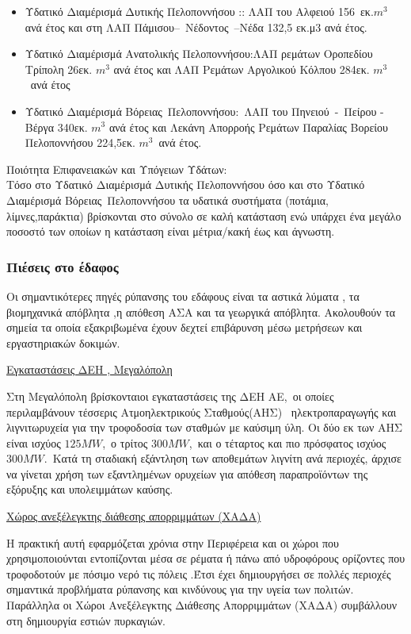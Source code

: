 \documentclass[12pt]{article}
\begin{document}
	\begin{itemize}
		\item Υδατικό Διαμέρισμά Δυτικής Πελοποννήσου :: ΛΑΠ του Αλφειού 156 εκ.$m^3$ ανά έτος και στη ΛΑΠ Πάμισου– Νέδοντος –Νέδα 132,5 εκ.μ3 ανά έτος.
		\item Υδατικό Διαμέρισμά Ανατολικής Πελοποννήσου:ΛΑΠ ρεμάτων Οροπεδίου Τρίπολη 26εκ. $m^3$ ανά έτος και ΛΑΠ Ρεμάτων Αργολικού Κόλπου 284εκ. $m^3$ ανά έτος
 		\item Υδατικό Διαμέρισμά Βόρειας Πελοποννήσου: ΛΑΠ του Πηνειού - Πείρου - Βέργα 340εκ. $m^3$ ανά έτος και  Λεκάνη Απορροής Ρεμάτων Παραλίας Βορείου Πελοποννήσου 224,5εκ. $m^3$ ανά έτος.
	\end{itemize}
	
	Ποιότητα Επιφανειακών και Υπόγειων Υδάτων: \\
	Τόσο στο Υδατικό Διαμέρισμά Δυτικής Πελοποννήσου όσο και στο Υδατικό Διαμέρισμά Βόρειας Πελοποννήσου τα υδατικά συστήματα (ποτάμια, λίμνες,παράκτια) βρίσκονται στο σύνολο σε καλή κατάσταση ενώ υπάρχει ένα μεγάλο ποσοστό των οποίων η κατάσταση είναι μέτρια/κακή έως και άγνωστη.
	
	\subsubsection{Πιέσεις στο έδαφος}
	
	Οι σημαντικότερες πηγές ρύπανσης του εδάφους είναι τα αστικά λύματα , τα βιομηχανικά απόβλητα ,η απόθεση ΑΣΑ και τα γεωργικά απόβλητα. Ακολουθούν τα σημεία τα οποία εξακριβωμένα έχουν δεχτεί επιβάρυνση μέσω μετρήσεων και εργαστηριακών δοκιμών.
	
	\underline{Εγκαταστάσεις ΔΕΗ , Μεγαλόπολη}
	
	Στη Μεγαλόπολη βρίσκονταιοι εγκαταστάσεις της ΔΕΗ ΑΕ, οι οποίες περιλαμβάνουν τέσσερις Ατμοηλεκτρικούς Σταθμούς(ΑΗΣ)  ηλεκτροπαραγωγής και λιγνιτωρυχεία για την τροφοδοσία των σταθμών με καύσιμη ύλη. Οι δύο εκ των ΑΗΣ είναι ισχύος
	$125MW$, ο τρίτος $300MW$, και ο τέταρτος και πιο πρόσφατος ισχύος $300MW$. Κατά τη σταδιακή εξάντληση των αποθεμάτων λιγνίτη ανά περιοχές, άρχισε να γίνεται χρήση των εξαντλημένων ορυχείων για απόθεση παραπροϊόντων της εξόρυξης και υπολειμμάτων καύσης.
	
	\underline{Χώρος ανεξέλεγκτης διάθεσης απορριμμάτων (ΧΑΔΑ)}
	
	Η πρακτική αυτή εφαρμόζεται χρόνια στην Περιφέρεια και οι χώροι που χρησιμοποιούνται εντοπίζονται μέσα σε ρέματα ή πάνω από υδροφόρους ορίζοντες που τροφοδοτούν με πόσιμο νερό τις πόλεις .Έτσι έχει δημιουργήσει σε πολλές περιοχές σημαντικά προβλήματα ρύπανσης και κινδύνους για την υγεία των πολιτών. Παράλληλα οι Χώροι Ανεξέλεγκτης Διάθεσης Απορριμμάτων  (ΧΑΔΑ) συμβάλλουν στη δημιουργία εστιών πυρκαγιών. 
	
\end{document}
